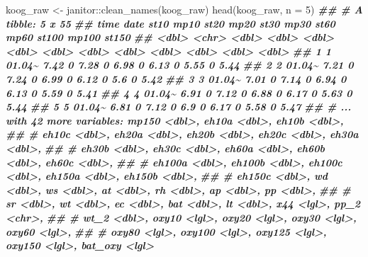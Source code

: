 \documentclass[
]{article}
\newenvironment{Shaded}{\begin{snugshade}}{\end{snugshade}}
\newcommand{\AttributeTok}[1]{\textcolor[rgb]{0.77,0.63,0.00}{#1}}
\newcommand{\DecValTok}[1]{\textcolor[rgb]{0.00,0.00,0.81}{#1}}
\newcommand{\DocumentationTok}[1]{\textcolor[rgb]{0.56,0.35,0.01}{\textbf{\textit{#1}}}}
\newcommand{\FunctionTok}[1]{\textcolor[rgb]{0.00,0.00,0.00}{#1}}
\newcommand{\NormalTok}[1]{#1}
\newcommand{\OtherTok}[1]{\textcolor[rgb]{0.56,0.35,0.01}{#1}}
\newcommand{\SpecialCharTok}[1]{\textcolor[rgb]{0.00,0.00,0.00}{#1}}
\begin{document}
\begin{Shaded}
\begin{Highlighting}[]
\NormalTok{koog\_raw }\OtherTok{\textless{}{-}}\NormalTok{ janitor}\SpecialCharTok{::}\FunctionTok{clean\_names}\NormalTok{(koog\_raw)}
\FunctionTok{head}\NormalTok{(koog\_raw, }\AttributeTok{n =} \DecValTok{5}\NormalTok{)}
\DocumentationTok{\#\# \# A tibble: 5 x 55}
\DocumentationTok{\#\#    time date    st10  mp10  st20  mp20  st30  mp30  st60  mp60 st100 mp100 st150}
\DocumentationTok{\#\#   \textless{}dbl\textgreater{} \textless{}chr\textgreater{}  \textless{}dbl\textgreater{} \textless{}dbl\textgreater{} \textless{}dbl\textgreater{} \textless{}dbl\textgreater{} \textless{}dbl\textgreater{} \textless{}dbl\textgreater{} \textless{}dbl\textgreater{} \textless{}dbl\textgreater{} \textless{}dbl\textgreater{} \textless{}dbl\textgreater{} \textless{}dbl\textgreater{}}
\DocumentationTok{\#\# 1     1 01.04\textasciitilde{}  7.42     0  7.28     0  6.98     0  6.13     0  5.55     0  5.44}
\DocumentationTok{\#\# 2     2 01.04\textasciitilde{}  7.21     0  7.24     0  6.99     0  6.12     0  5.6      0  5.42}
\DocumentationTok{\#\# 3     3 01.04\textasciitilde{}  7.01     0  7.14     0  6.94     0  6.13     0  5.59     0  5.41}
\DocumentationTok{\#\# 4     4 01.04\textasciitilde{}  6.91     0  7.12     0  6.88     0  6.17     0  5.63     0  5.44}
\DocumentationTok{\#\# 5     5 01.04\textasciitilde{}  6.81     0  7.12     0  6.9      0  6.17     0  5.58     0  5.47}
\DocumentationTok{\#\# \# ... with 42 more variables: mp150 \textless{}dbl\textgreater{}, eh10a \textless{}dbl\textgreater{}, eh10b \textless{}dbl\textgreater{},}
\DocumentationTok{\#\# \#   eh10c \textless{}dbl\textgreater{}, eh20a \textless{}dbl\textgreater{}, eh20b \textless{}dbl\textgreater{}, eh20c \textless{}dbl\textgreater{}, eh30a \textless{}dbl\textgreater{},}
\DocumentationTok{\#\# \#   eh30b \textless{}dbl\textgreater{}, eh30c \textless{}dbl\textgreater{}, eh60a \textless{}dbl\textgreater{}, eh60b \textless{}dbl\textgreater{}, eh60c \textless{}dbl\textgreater{},}
\DocumentationTok{\#\# \#   eh100a \textless{}dbl\textgreater{}, eh100b \textless{}dbl\textgreater{}, eh100c \textless{}dbl\textgreater{}, eh150a \textless{}dbl\textgreater{}, eh150b \textless{}dbl\textgreater{},}
\DocumentationTok{\#\# \#   eh150c \textless{}dbl\textgreater{}, wd \textless{}dbl\textgreater{}, ws \textless{}dbl\textgreater{}, at \textless{}dbl\textgreater{}, rh \textless{}dbl\textgreater{}, ap \textless{}dbl\textgreater{}, pp \textless{}dbl\textgreater{},}
\DocumentationTok{\#\# \#   sr \textless{}dbl\textgreater{}, wt \textless{}dbl\textgreater{}, ec \textless{}dbl\textgreater{}, bat \textless{}dbl\textgreater{}, lt \textless{}dbl\textgreater{}, x44 \textless{}lgl\textgreater{}, pp\_2 \textless{}chr\textgreater{},}
\DocumentationTok{\#\# \#   wt\_2 \textless{}dbl\textgreater{}, oxy10 \textless{}lgl\textgreater{}, oxy20 \textless{}lgl\textgreater{}, oxy30 \textless{}lgl\textgreater{}, oxy60 \textless{}lgl\textgreater{},}
\DocumentationTok{\#\# \#   oxy80 \textless{}lgl\textgreater{}, oxy100 \textless{}lgl\textgreater{}, oxy125 \textless{}lgl\textgreater{}, oxy150 \textless{}lgl\textgreater{}, bat\_oxy \textless{}lgl\textgreater{}}
\end{Highlighting}
\end{Shaded}
\end{document}
